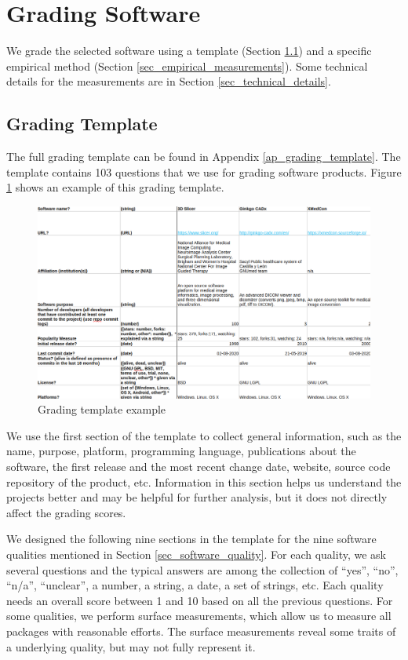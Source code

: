 \section{Grading Software}
\label{sec_grading_software}

We grade the selected software using a template (Section \ref{sec_grading_template}) and a specific empirical method (Section \ref{sec_empirical_measurements}). Some technical details for the measurements are in Section \ref{sec_technical_details}.

\subsection{Grading Template}
\label{sec_grading_template}
The full grading template can be found in Appendix \ref{ap_grading_template}. The template contains 103 questions that we use for grading software products. Figure \ref{fg_grading_template_example} shows an example of this grading template.

\begin{figure}[h]
\includegraphics[scale=0.42]{figures/template.png}
\caption{Grading template example}
\label{fg_grading_template_example}
\end{figure}

We use the first section of the template to collect general information, such as the name, purpose, platform, programming language, publications about the software, the first release and the most recent change date, website, source code repository of the product, etc. Information in this section helps us understand the projects better and may be helpful for further analysis, but it does not directly affect the grading scores.

We designed the following nine sections in the template for the nine software qualities mentioned in Section \ref{sec_software_quality}. For each quality, we ask several questions and the typical answers are among the collection of ``yes'', ``no'', ``n/a'', ``unclear'', a number, a string, a date, a set of strings, etc. Each quality needs an overall score between 1 and 10 based on all the previous questions. For some qualities, we perform surface measurements, which allow us to measure all packages with reasonable efforts. The surface measurements reveal some traits of a underlying quality, but may not fully represent it.


